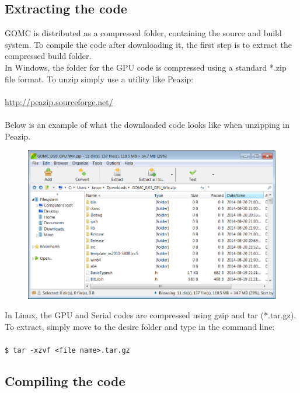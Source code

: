 \subsection{Extracting the code}
GOMC is distributed as a compressed folder, containing the source and build system. To compile the code after downloading it, the first step is to extract the compressed build folder.\\
In Windows, the folder for the GPU code is compressed using a standard *.zip file format. To unzip simply use a utility like Peazip: \\\\
\url{http://peazip.sourceforge.net/}\\\\
Below is an example of what the downloaded code looks like when unzipping in Peazip.
\begin{figure}[H]
\centering
\includegraphics[scale=0.6]{images/peazip}
\end{figure}
In Linux, the GPU and Serial codes are compressed using gzip and tar (*.tar.gz).  To extract, simply move to the desire folder and type in the command line:\\\\
\texttt{\$ tar -xzvf <file name>.tar.gz}
\subsection{Compiling the code}
